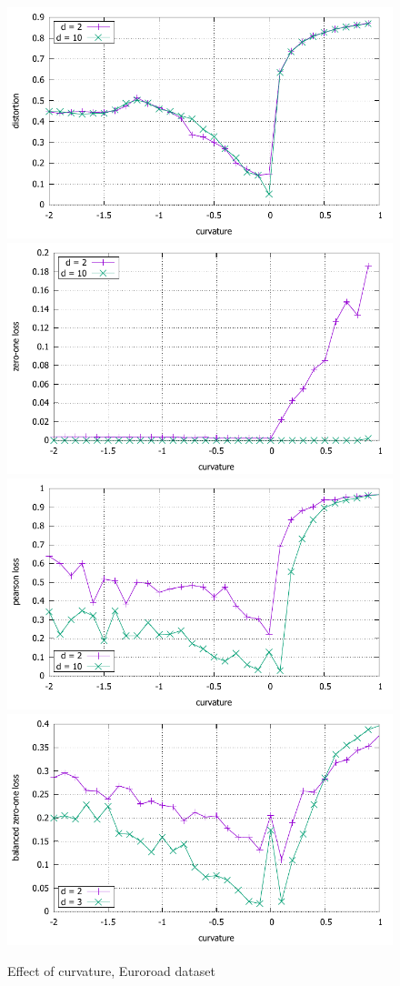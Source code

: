 \documentclass{article} %
\begin{document}
\begin{figure}
    \centering
    \includegraphics[width = 0.49 \textwidth]{euroroad_distortion.pdf}
    \includegraphics[width = 0.49 \textwidth]{euroroad_zero_one.pdf}
     \includegraphics[width = 0.49 \textwidth]{euroroad_pearson.pdf}
    \includegraphics[width = 0.49 \textwidth]{euroroad_balanced_zero_one.pdf}
    \caption{Effect of curvature, Euroroad dataset}
    \label{fig:euroroad}
\end{figure}
\end{document}
